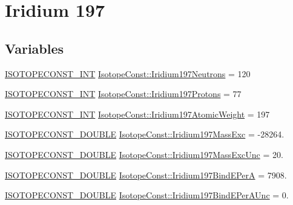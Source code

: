 \hypertarget{group___isotope_const-_iridium-_ir197}{}\section{Iridium 197}
\label{group___isotope_const-_iridium-_ir197}
\subsection*{Variables}
\begin{DoxyCompactItemize}
\item 
\mbox{\hyperlink{group___isotope_const-_macros_ga5f18360b3e99483a35c32d789e62621c}{I\+S\+O\+T\+O\+P\+E\+C\+O\+N\+S\+T\+\_\+\+I\+NT}} \mbox{\hyperlink{group___isotope_const-_iridium-_ir197_gad2482e251bf962048db7ad4bbe21f09f}{Isotope\+Const\+::\+Iridium197\+Neutrons}} = 120
\item 
\mbox{\hyperlink{group___isotope_const-_macros_ga5f18360b3e99483a35c32d789e62621c}{I\+S\+O\+T\+O\+P\+E\+C\+O\+N\+S\+T\+\_\+\+I\+NT}} \mbox{\hyperlink{group___isotope_const-_iridium-_ir197_ga274b32d97e843d83741cafa9ae49a7e0}{Isotope\+Const\+::\+Iridium197\+Protons}} = 77
\item 
\mbox{\hyperlink{group___isotope_const-_macros_ga5f18360b3e99483a35c32d789e62621c}{I\+S\+O\+T\+O\+P\+E\+C\+O\+N\+S\+T\+\_\+\+I\+NT}} \mbox{\hyperlink{group___isotope_const-_iridium-_ir197_ga167d98fc52a5fe8faa4844dfba08ed00}{Isotope\+Const\+::\+Iridium197\+Atomic\+Weight}} = 197
\item 
\mbox{\hyperlink{group___isotope_const-_macros_ga8f45a7272ce02c0b4c65c44636ed719a}{I\+S\+O\+T\+O\+P\+E\+C\+O\+N\+S\+T\+\_\+\+D\+O\+U\+B\+LE}} \mbox{\hyperlink{group___isotope_const-_iridium-_ir197_ga89e52981362df4d9a439eb72452ac3c4}{Isotope\+Const\+::\+Iridium197\+Mass\+Exc}} = -\/28264.
\item 
\mbox{\hyperlink{group___isotope_const-_macros_ga8f45a7272ce02c0b4c65c44636ed719a}{I\+S\+O\+T\+O\+P\+E\+C\+O\+N\+S\+T\+\_\+\+D\+O\+U\+B\+LE}} \mbox{\hyperlink{group___isotope_const-_iridium-_ir197_ga9e58a477ba9832a2647dac65c11b554b}{Isotope\+Const\+::\+Iridium197\+Mass\+Exc\+Unc}} = 20.
\item 
\mbox{\hyperlink{group___isotope_const-_macros_ga8f45a7272ce02c0b4c65c44636ed719a}{I\+S\+O\+T\+O\+P\+E\+C\+O\+N\+S\+T\+\_\+\+D\+O\+U\+B\+LE}} \mbox{\hyperlink{group___isotope_const-_iridium-_ir197_ga7de2b9491dd5efbd504d23398fed8971}{Isotope\+Const\+::\+Iridium197\+Bind\+E\+PerA}} = 7908.
\item 
\mbox{\hyperlink{group___isotope_const-_macros_ga8f45a7272ce02c0b4c65c44636ed719a}{I\+S\+O\+T\+O\+P\+E\+C\+O\+N\+S\+T\+\_\+\+D\+O\+U\+B\+LE}} \mbox{\hyperlink{group___isotope_const-_iridium-_ir197_ga760dda32cb426cc2f9fa6b489da69a6d}{Isotope\+Const\+::\+Iridium197\+Bind\+E\+Per\+A\+Unc}} = 0.

\end{DoxyCompactItemize}
